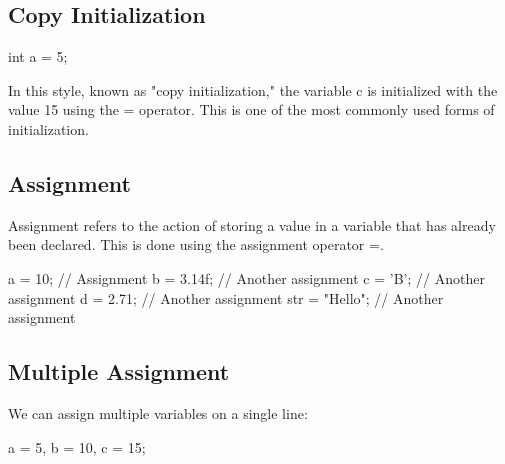 \documentclass{report}
\begin{document}
    \bigbreak \noindent 
    \subsection{Copy Initialization}
    \bigbreak \noindent 
    
    \begin{cppcode}
int a = 5;
    \end{cppcode}
    
    \bigbreak \noindent 
    In this style, known as "copy initialization," the variable c is initialized with the value 15 using the = operator. This is one of the most commonly used forms of initialization.



    \bigbreak \noindent 
    \subsection{Assignment}
    \bigbreak \noindent 
    Assignment refers to the action of storing a value in a variable that has already been declared. This is done using the assignment operator =.
    \bigbreak \noindent 
    
    \begin{cppcode}
a = 10;            // Assignment
b = 3.14f;         // Another assignment
c = 'B';           // Another assignment
d = 2.71;          // Another assignment
str = "Hello";     // Another assignment
    \end{cppcode}
    
    \bigbreak \noindent 
    \subsection{Multiple Assignment}
    \bigbreak \noindent 
    We can assign multiple variables on a single line:
    \bigbreak \noindent 
    
    \begin{cppcode}
a = 5, b = 10, c = 15;
    \end{cppcode}
    
\end{document}
